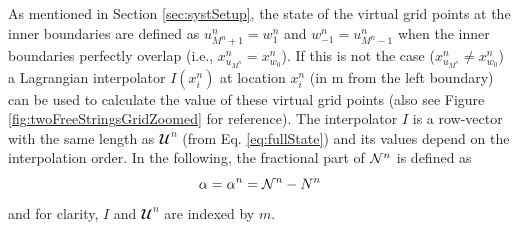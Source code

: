 As mentioned in Section \ref{sec:systSetup}, the state of the virtual grid points at the inner boundaries are defined as $u_{M^n+1}^n = w_1^n$ and $w_{-1}^n = u_{M^n-1}^n$ when the inner boundaries perfectly overlap  (i.e., $x^n_{u_{M^n}} = x^n_{w_0}$). If this is not the case ($x^n_{u_{M^n}} \neq x^n_{w_0}$) a Lagrangian interpolator $I(x_i^n)$ at location $x_i^n$ (in m from the left boundary) can be used to calculate the value of these virtual grid points (also see Figure \ref{fig:twoFreeStringsGridZoomed} for reference). The interpolator $I$ is a row-vector with the same length as $\mathbfcal{U}^n$ (from Eq. \eqref{eq:fullState}) and its values depend on the interpolation order. %
In the following, the fractional part of $\mathcal{N}^n$ %
is defined as 
\begin{equation}\label{eq:alphaDef}
    \alpha = \alpha^n = \Nfrac^n - N^n %
\end{equation}
 and for clarity, $I$ and $\mathbfcal{U}^n$ are indexed by $m$.
